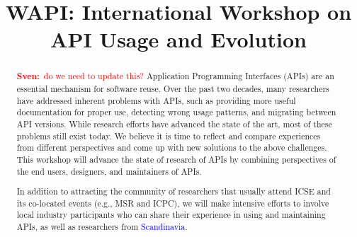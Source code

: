 \documentclass[10pt, conference]{IEEEtran}
\newcommand{\sa}[1]{{\textcolor{red}{\textbf{Sven:}~#1}}}
\newcommand{\updated}[1]{{\textcolor{blue}{#1}}}
\newcommand{\shortname}{WAPI}
\begin{document}
\title{\shortname{}: International Workshop on API Usage and Evolution}


\newcommand\tud[0]{\textsuperscript{\normalfont \textdagger}}
\newcommand\iowa[0]{\textsuperscript{\normalfont \textparagraph}}
\newcommand\utd[0]{\textsuperscript{\normalfont \ddag}}
\newcommand\lanu[0]{\textsuperscript{\normalfont \textsection}}
\newcommand\ualberta[0]{\textsuperscript{\normalfont \textasteriskcentered}}

\author{
\and
{}
\and
{}
\and
{}
\and
{}
}


\maketitle


\begin{abstract}
  \sa{do we need to update this?}
Application Programming Interfaces (APIs) are an essential mechanism for software reuse. Over the past two decades, many researchers have addressed inherent problems with APIs, such as providing more useful documentation for proper use, detecting wrong usage patterns, and migrating between API versions. While research efforts have advanced the state of the art, most of these problems still exist today. We believe it is time to reflect and compare experiences from different perspectives and come up with new solutions to the above challenges. This workshop will advance the state of research of APIs by combining perspectives of the end users, designers, and maintainers of APIs.

In addition to attracting the community of researchers that usually attend ICSE and its co-located events (e.g., MSR and ICPC), we will make intensive efforts to involve local industry participants who can share their experience in using and maintaining APIs, as well as researchers from \updated{Scandinavia}.
\end{abstract}
\end{document}
